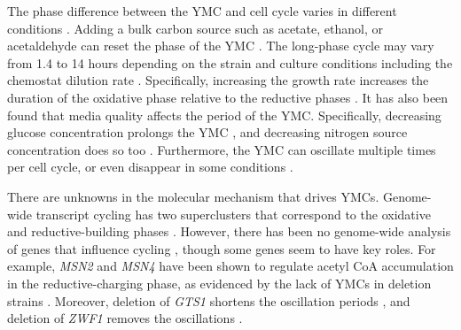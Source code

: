 
The phase difference between the YMC and cell cycle varies in different conditions \citep{ewaldYeastCyclinDependentKinase2016}. %
Adding a bulk carbon source such as acetate, ethanol, or acetaldehyde can reset the phase of the YMC \citep{kuangMsn2RegulateExpression2017, krishnaMinimalPushPull2018}.
The long-phase cycle may vary from 1.4 to 14 hours depending on the strain and culture conditions including the chemostat dilution rate \citep{caustonMetabolicRhythmsFramework2018}.
Specifically, increasing the growth rate increases the duration of the oxidative phase relative to the reductive phases \citep{slavovCouplingGrowthRate2011}.
It has also been found that media quality affects the period of the YMC.
Specifically, decreasing glucose concentration prolongs the YMC \citep{mellorMolecularBasisMetabolic2016,papagiannakisAutonomousMetabolicOscillations2017}, and decreasing nitrogen source concentration does so too \citep{baumgartnerFlavinbasedMetabolicCycles2018}.
Furthermore, the YMC can oscillate multiple times per cell cycle, or even disappear in some conditions \citep{baumgartnerFlavinbasedMetabolicCycles2018}. %


There are unknowns in the molecular mechanism that drives YMCs.
Genome-wide transcript cycling has two superclusters that correspond to the oxidative and reductive-building phases \citep{machneYinYangYeast2012}.
However, there has been no genome-wide analysis of genes that influence cycling \citep{mellorMolecularBasisMetabolic2016}, though some genes seem to have key roles.
For example, \emph{MSN2} and \emph{MSN4} have been shown to regulate acetyl CoA accumulation in the reductive-charging phase, as evidenced by the lack of YMCs in deletion strains \citep{kuangMsn2RegulateExpression2017}.
Moreover, deletion of \emph{GTS1} shortens the oscillation periods \citep{lloydUltradianMetronomeTimekeeper2005}, and deletion of \emph{ZWF1} removes the oscillations \citep{tuCyclicChangesMetabolic2007}.

